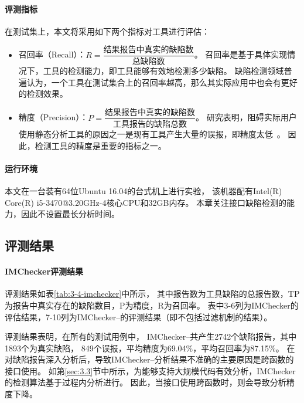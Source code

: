 \paragraph{评测指标}
在测试集上，本文将采用如下两个指标对工具进行评估：
\begin{itemize}
	\item 召回率（Recall）：$R = \dfrac{\text{结果报告中真实的缺陷数}}{\text{总缺陷数}}$。
	召回率是基于具体实现情况下，工具的检测能力，即工具能够有效地检测多少缺陷。
	缺陷检测领域普遍认为，一个工具在测试集合上的召回率越高，那么其实际应用中也会有更好的检测效果。
	\item 精度（Precision）：$P = \dfrac{\text{结果报告中真实的缺陷数}}{\text{工具报告的缺陷总数}}$。
	研究表明，阻碍实际用户使用静态分析工具的原因之一是现有工具产生大量的误报，即精度太低~\cite{10-acm-precision}。
	因此，检测工具的精度是重要的指标之一。
\end{itemize}

\paragraph{运行环境} 本文在一台装有64位Ubuntu 16.04的台式机上进行实验，
该机器配有Intel(R) Core(R) i5-3470@3.20GHz-4核心CPU和32GB内存。
本章关注接口缺陷检测的能力，因此不设置最长分析时间。


\subsection{评测结果}


\paragraph{IMChecker评测结果}
评测结果如表\ref{tab:3-4-imchecker}中所示，
其中报告数为工具缺陷的总报告数，TP为报告中真实存在的缺陷数目，P为精度，R为召回率。
表中3-6列为IMChecker的评估结果，7-10列为IMChecker--的评测结果（即不包括过滤机制的结果）。

评测结果表明，在所有的测试用例中，
IMChecker--共产生2742个缺陷报告，其中1893个为真实缺陷，
849个误报，平均精度为69.04\%，平均召回率为87.15\%。
在对缺陷报告深入分析后，导致IMChecker--分析结果不准确的主要原因是跨函数的接口使用。
如第\ref{sec:3.3}节中所示，为能够支持大规模代码有效分析，IMChecker的检测算法基于过程内分析进行。
因此，当接口使用跨函数时，则会导致分析精度下降。

